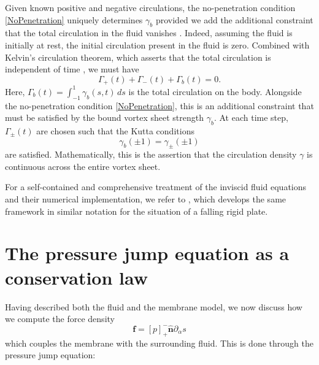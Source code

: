 \documentclass{article}[12pt]
\theoremstyle{Theorem}
\begin{document}
 Given known positive and negative circulations, the no-penetration condition \eqref{NoPenetration} uniquely determines $\gamma_b$ provided we add the additional constraint that the total circulation in the fluid vanishes \cite{Golberg1990IntroductionTT} \cite[285]{eldredge_inviscid_flows}. Indeed, assuming the fluid is initially at rest, the initial circulation present in the fluid is zero. Combined with Kelvin's circulation theorem, which asserts that the total circulation is independent of time \cite[36]{eldredge_inviscid_flows}, we must have
\begin{equation} \label{Kelvin's Circulation Theorem}
    \Gamma_+(t) + \Gamma_-(t) + \Gamma_b(t) = 0.
\end{equation}
Here, $\Gamma_b(t) = \int_{-1}^1\gamma_b(s,t)\, ds$ is the total circulation on the body. Alongside the no-penetration condition \eqref{NoPenetration}, this is an additional constraint that must be satisfied by the bound vortex sheet strength $\gamma_b$. At each time step, $\Gamma_\pm(t)$ are chosen such that the Kutta conditions 
\begin{equation}
    \gamma_b(\pm1) = \gamma_\pm(\pm 1)
    \label{kutta condition}
\end{equation}are satisfied. 
Mathematically, this is the assertion that the circulation density $\gamma$ is continuous across the entire vortex sheet.
\newline

For a self-contained and comprehensive treatment of the inviscid fluid equations and their numerical implementation, we refer to \cite{loo2025falling}, which develops the same framework in similar notation for the situation of a falling rigid plate.

\section{The pressure jump equation as a conservation law}
\label{pressure jump equation as a conservation law section}
Having described both the fluid and the membrane model, we now discuss how we compute the force density 
\begin{equation}
    \boldsymbol{f} = [p]^{-}_+\hat{\boldsymbol{n}}\partial_\alpha s
\end{equation}
which couples the membrane with the surrounding fluid. This is done through the pressure jump equation:
\end{document}
